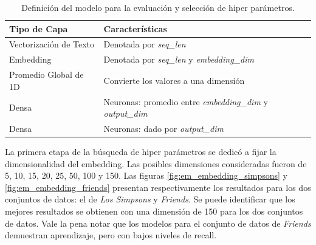 \begin{table}[h]
    \centering
    \begin{tabular}{|l|l|}
        \hline
        \textbf{Tipo de Capa} & \textbf{Características} \\ \hline
        Vectorización de Texto & Denotada por \textit{seq\_len} \\ \hline
        Embedding & Denotada por \textit{seq\_len} y \textit{embedding\_dim} \\ \hline
        Promedio Global de 1D & Convierte los valores a una dimensión \\ \hline
        Densa & Neuronas: promedio entre \textit{embedding\_dim} y \textit{output\_dim} \\ \hline
        Densa & Neuronas: dado por \textit{output\_dim} \\ \hline
    \end{tabular}
    \caption{Definición del modelo para la evaluación y selección de hiper parámetros.}
    \label{tab:deep_em_hyper_params}
\end{table}

La primera etapa de la búsqueda de hiper parámetros se dedicó a fijar la dimensionalidad del embedding. Las posibles dimensiones consideradas fueron de 5, 10, 15, 20, 25, 50, 100 y 150. Las figuras \ref{fig:em_embedding_simpsons} y \ref{fig:em_embedding_friends} presentan respectivamente los resultados para los dos conjuntos de datos: el de \textit{Los Simpsons} y \textit{Friends}. Se puede identificar que los mejores resultados se obtienen con una dimensión de 150 para los dos conjuntos de datos. Vale la pena notar que los modelos para el conjunto de datos de \textit{Friends} demuestran aprendizaje, pero con bajos niveles de recall. 

